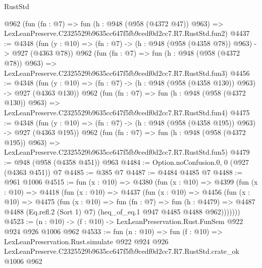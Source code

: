 \begin{lexlean}{RustStd}
\begin{coremodule}
    @962
    (fun (fn : @7) =>
    fun (h : @948 (@958 (@4372 @47)) @963) =>
    LexLeanPreserve.C2325529b9635cc647f5fb9cedf0d2cc7.R7.RustStd.fun2)
@4437 := @4348
    (fun (y : @10) => (fn : @7) -> (h : @948 (@958 (@4358 @78)) @963) -> @927 (@4363 @78))
    @962
    (fun (fn : @7) =>
    fun (h : @948 (@958 (@4372 @78)) @963) =>
    LexLeanPreserve.C2325529b9635cc647f5fb9cedf0d2cc7.R7.RustStd.fun3)
@4456 := @4348
    (fun (y : @10) => (fn : @7) -> (h : @948 (@958 (@4358 @130)) @963) -> @927 (@4363 @130))
    @962
    (fun (fn : @7) =>
    fun (h : @948 (@958 (@4372 @130)) @963) =>
    LexLeanPreserve.C2325529b9635cc647f5fb9cedf0d2cc7.R7.RustStd.fun4)
@4475 := @4348
    (fun (y : @10) => (fn : @7) -> (h : @948 (@958 (@4358 @195)) @963) -> @927 (@4363 @195))
    @962
    (fun (fn : @7) =>
    fun (h : @948 (@958 (@4372 @195)) @963) =>
    LexLeanPreserve.C2325529b9635cc647f5fb9cedf0d2cc7.R7.RustStd.fun5)
@4479 := @948 (@958 (@4358 @451)) @963
@4484 := Option.noConfusion.{0, 0} (@927 (@4363 @451)) @7
@4485 := @385 @7
@4487 := @4484 @4485 @7
@4488 := @961 @1006
@4515 := fun (x : @10) =>
  @4380
    (fun (x : @10) =>
    @4399
      (fun (x : @10) =>
      @4418
        (fun (x : @10) =>
        @4437
          (fun (x : @10) =>
          @4456
            (fun (x : @10) =>
            @4475
              (fun (x : @10) =>
              fun (fn : @7) =>
              fun (h : @4479) =>
              @4487 @4488 (Eq.refl.{2} (Sort 1) @7) (heq_of_eq.{1} @947 @4485 @4488 @962)))))))
@4523 := (n : @10) -> (f : @10) -> LexLeanPreservation.Rust.FunSem @922 @924 @926 @1006 @962
@4533 := fun (n : @10) =>
  fun (f : @10) =>
  LexLeanPreservation.Rust.simulate
    @922
    @924
    @926
    LexLeanPreserve.C2325529b9635cc647f5fb9cedf0d2cc7.R7.RustStd.crate_ok
    @1006
    @962
\end{coremodule}
\end{lexlean}
